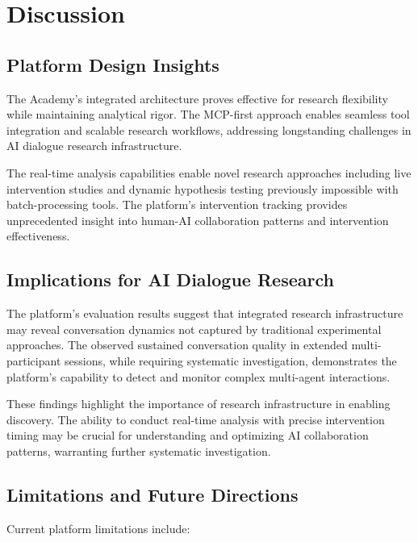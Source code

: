 \documentclass[11pt,letterpaper]{article}
\newcommand{\theacademy}{The Academy}
\newcommand{\mcp}{MCP}
\begin{document}
\section{Discussion}

\subsection{Platform Design Insights}

\theacademy{}'s integrated architecture proves effective for research flexibility while maintaining analytical rigor. The \mcp{}-first approach enables seamless tool integration and scalable research workflows, addressing longstanding challenges in AI dialogue research infrastructure.

The real-time analysis capabilities enable novel research approaches including live intervention studies and dynamic hypothesis testing previously impossible with batch-processing tools. The platform's intervention tracking provides unprecedented insight into human-AI collaboration patterns and intervention effectiveness.

\subsection{Implications for AI Dialogue Research}

The platform's evaluation results suggest that integrated research infrastructure may reveal conversation dynamics not captured by traditional experimental approaches. The observed sustained conversation quality in extended multi-participant sessions, while requiring systematic investigation, demonstrates the platform's capability to detect and monitor complex multi-agent interactions.

These findings highlight the importance of research infrastructure in enabling discovery. The ability to conduct real-time analysis with precise intervention timing may be crucial for understanding and optimizing AI collaboration patterns, warranting further systematic investigation.

\subsection{Limitations and Future Directions}

Current platform limitations include:
\end{document}
